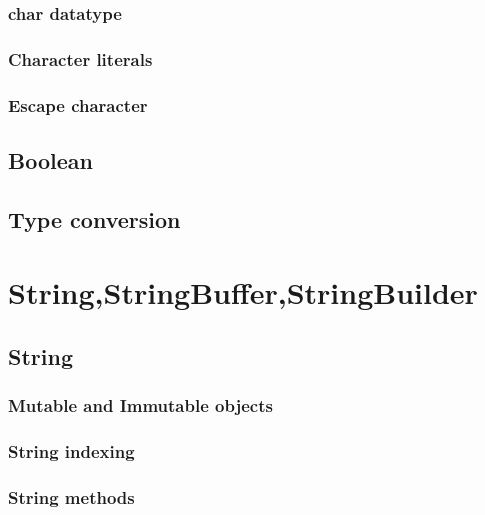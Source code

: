 \documentclass[14pt,fleqn]{extbook} %
\begin{document}
\subsection{char datatype}

\subsection{Character literals}

\subsection{Escape character}

\section{Boolean}

\section{Type conversion}




\chapter{String,StringBuffer,StringBuilder}
\section{String}

\subsection{Mutable and Immutable objects}


\subsection{String indexing}
	
\subsection{String methods}
	
\end{document}
